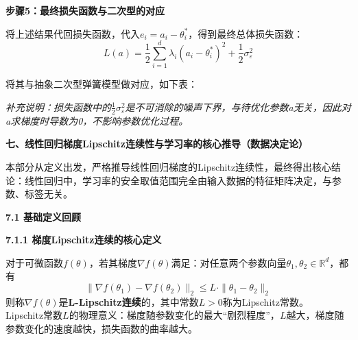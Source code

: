\documentclass[10pt]{article}
\numberwithin{equation}{section}
\theoremstyle{plain}
\theoremstyle{definition}
\theoremstyle{remark}
\begin{document}
{\par\vspace{0.8ex}\noindent\normalsize\bfseries\color{secblue} 步骤5：最终损失函数与二次型的对应\par}
将上述结果代回损失函数，代入$e_i = a_i - \theta_i^*$，得到最终总体损失函数：
\[ L(a) = \frac{1}{2} \sum_{i=1}^d \lambda_i (a_i - \theta_i^*)^2 + \frac{1}{2} \sigma_\varepsilon^2 \]

将其与抽象二次型弹簧模型做对应，如下表：
\begin{center}
\renewcommand{\arraystretch}{1.3}
\end{center}
\textit{补充说明：损失函数中的$\frac{1}{2}\sigma_\varepsilon^2$是不可消除的噪声下界，与待优化参数a无关，因此对a求梯度时导数为0，不影响参数优化过程。}

{\par\vspace{1ex}\noindent\large\bfseries\color{brandD} 七、线性回归梯度Lipschitz连续性与学习率的核心推导（数据决定论）\par}\par\vspace{0.5ex}
本部分从定义出发，严格推导线性回归梯度的Lipschitz连续性，最终得出核心结论：线性回归中，学习率的安全取值范围完全由输入数据的特征矩阵决定，与参数、标签无关。

{\par\vspace{0.8ex}\noindent\normalsize\bfseries\color{secblue} 7.1 基础定义回顾\par}
{\par\vspace{0.8ex}\noindent\normalsize\bfseries\color{secblue} 7.1.1 梯度Lipschitz连续的核心定义\par}
对于可微函数$f(\theta)$，若其梯度$\nabla f(\theta)$满足：对任意两个参数向量$\theta_1, \theta_2 \in \mathbb{R}^d$，都有
\[ \|\nabla f(\theta_1) - \nabla f(\theta_2)\|_2 \le L \cdot \|\theta_1 - \theta_2\|_2 \]
则称$\nabla f(\theta)$是\textbf{L-Lipschitz连续}的，其中常数$L>0$称为Lipschitz常数。\\
Lipschitz常数$L$的物理意义：梯度随参数变化的最大“剧烈程度”，$L$越大，梯度随参数变化的速度越快，损失函数的曲率越大。
\end{document}
